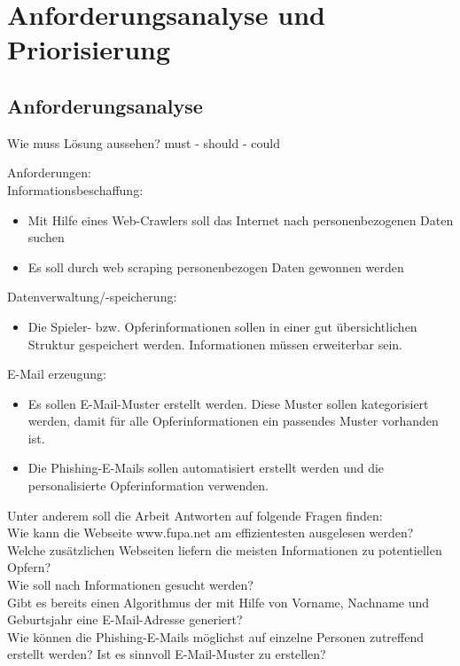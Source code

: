 
\chapter{Anforderungsanalyse und Priorisierung}  %
\label{cha:} %
\section{Anforderungsanalyse} %
\label{sec:} %
Wie muss Lösung aussehen? must - should - could

Anforderungen:\\

Informationsbeschaffung:
\begin{itemize}
	\item Mit Hilfe eines Web-Crawlers soll das Internet nach personenbezogenen Daten suchen
	\item Es soll durch web scraping personenbezogen Daten gewonnen werden
\end{itemize}

Datenverwaltung/-speicherung:
\begin{itemize}
\item Die Spieler- bzw. Opferinformationen sollen in einer gut übersichtlichen Struktur gespeichert werden. Informationen müssen erweiterbar sein.
\end{itemize}

E-Mail erzeugung:
\begin{itemize}
\item Es sollen E-Mail-Muster erstellt werden. Diese Muster sollen kategorisiert werden, damit für alle Opferinformationen ein passendes Muster vorhanden ist.
\item Die Phishing-E-Mails sollen automatisiert erstellt werden und die personalisierte Opferinformation verwenden.
\end{itemize}

Unter anderem soll die Arbeit Antworten auf folgende Fragen finden:\\
Wie kann die Webseite www.fupa.net am effizientesten ausgelesen werden?\\
Welche zusätzlichen Webseiten liefern die meisten Informationen zu potentiellen Opfern?\\
Wie soll nach Informationen gesucht werden?\\
Gibt es bereits einen Algorithmus der mit Hilfe von Vorname, Nachname und Geburtsjahr eine E-Mail-Adresse generiert?\\
Wie können die Phishing-E-Mails möglichst auf einzelne Personen zutreffend erstellt werden? Ist es sinnvoll E-Mail-Muster zu erstellen?\\

